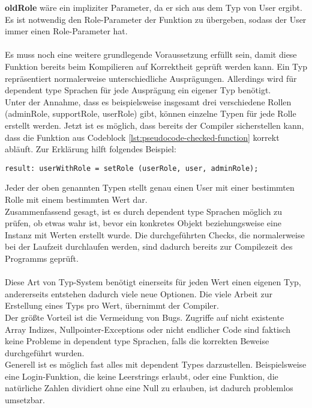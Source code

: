 \textbf{oldRole} wäre ein impliziter Parameter, da er sich aus dem Typ von User ergibt. Es ist notwendig den Role-Parameter der Funktion zu übergeben, sodass der User immer einen Role-Parameter hat.\\
\\
Es muss noch eine weitere grundlegende Voraussetzung erfüllt sein, damit diese Funktion bereits beim Kompilieren auf Korrektheit geprüft werden kann. Ein Typ repräsentiert normalerweise unterschiedliche Ausprägungen. Allerdings wird für dependent type Sprachen für jede Ausprägung ein eigener Typ benötigt.\\
Unter der Annahme, dass es beispielsweise insgesamt drei verschiedene Rollen (adminRole, supportRole, userRole) gibt, können einzelne Typen für jede Rolle erstellt werden.
Jetzt ist es möglich, dass bereits der Compiler sicherstellen kann, dass die Funktion aus Codeblock \ref{lst:pseudocode-checked-function} korrekt abläuft. Zur Erklärung hilft folgendes Beispiel:
\begin{lstlisting}[language=coq,firstnumber=1,caption=Pseudocode Check auf null des User Objektes,label=lst:pseudocode-checked-function-usage]
result: userWithRole = setRole (userRole, user, adminRole);
\end{lstlisting}
Jeder der oben genannten Typen stellt genau einen User mit einer bestimmten Rolle mit einem bestimmten Wert dar.\\
Zusammenfassend gesagt, ist es durch dependent type Sprachen möglich zu prüfen, ob etwas wahr ist, bevor ein konkretes Objekt beziehungsweise eine Instanz mit Werten erstellt wurde. Die durchgeführten Checks, die normalerweise bei der Laufzeit durchlaufen werden, sind dadurch bereits zur Compilezeit des Programms geprüft.\cite{MARTIN01:FV}\\
\\
Diese Art von Typ-System benötigt einerseits für jeden Wert einen eigenen Typ, andererseits entstehen dadurch viele neue Optionen. Die viele Arbeit zur Erstellung eines Typs pro Wert, übernimmt der Compiler.\\
Der größte Vorteil ist die Vermeidung von Bugs. Zugriffe auf nicht existente Array Indizes, Nullpointer-Exceptions oder nicht endlicher Code sind faktisch keine Probleme in dependent type Sprachen, falls die korrekten Beweise durchgeführt wurden.\\
Generell ist es möglich fast alles mit dependent Types darzustellen. Beispielsweise eine Login-Funktion, die keine Leerstrings erlaubt, oder eine Funktion, die natürliche Zahlen dividiert ohne eine Null zu erlauben, ist dadurch problemlos umsetzbar.

